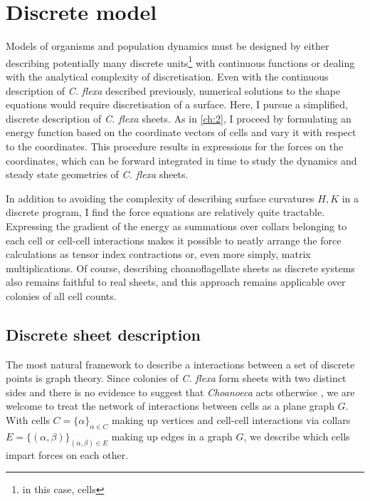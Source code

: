 \chapter{Discrete model} \label{ch:3}

\ifpdf
    \graphicspath{{Chapter3/Figs/Raster/}{Chapter3/Figs/PDF/}{Chapter3/Figs/}}
\else
    \graphicspath{{Chapter3/Figs/Vector/}{Chapter3/Figs/}}
\fi

Models of organisms and population dynamics must be designed by either describing potentially many discrete units\footnote{in this case, cells} with continuous functions or dealing with the analytical complexity of discretisation. 
Even with the continuous description of \textit{C. flexa} described previously, numerical solutions to the shape equations would require discretisation of a surface. 
Here, I pursue a simplified, discrete description of \textit{C. flexa} sheets. 
As in \cref{ch:2}, I proceed by formulating an energy function based on the coordinate vectors of cells and vary it with respect to the coordinates. 
This procedure results in expressions for the forces on the coordinates, which can be forward integrated in time to study the dynamics and steady state geometries of \textit{C. flexa} sheets.

In addition to avoiding the complexity of describing surface curvatures $H, K$ in a discrete program, I find the force equations are relatively quite tractable. 
Expressing the gradient of the energy as summations over collars belonging to each cell or cell-cell interactions makes it possible to neatly arrange the force calculations as tensor index contractions or, even more simply, matrix multiplications. 
Of course, describing choanoflagellate sheets as discrete systems also remains faithful to real sheets, and this approach remains applicable over colonies of all cell counts. 

\section{Discrete sheet description}

The most natural framework to describe a interactions between a set of discrete points is graph theory. 
Since colonies of \textit{C. flexa} form sheets with two distinct sides and there is no evidence to suggest that \textit{Choanoeca} acts otherwise \citep{brunet2019,leadbeater1983}, we are welcome to treat the network of interactions between cells as a plane graph $G$. 
With cells $C = \{\alpha\}_{\alpha\in C}$ making up vertices and cell-cell interactions via collars $E = \{(\alpha, \beta)\}_{(\alpha,\beta)\in E}$ making up edges in a graph $G$, we describe which cells impart forces on each other.

